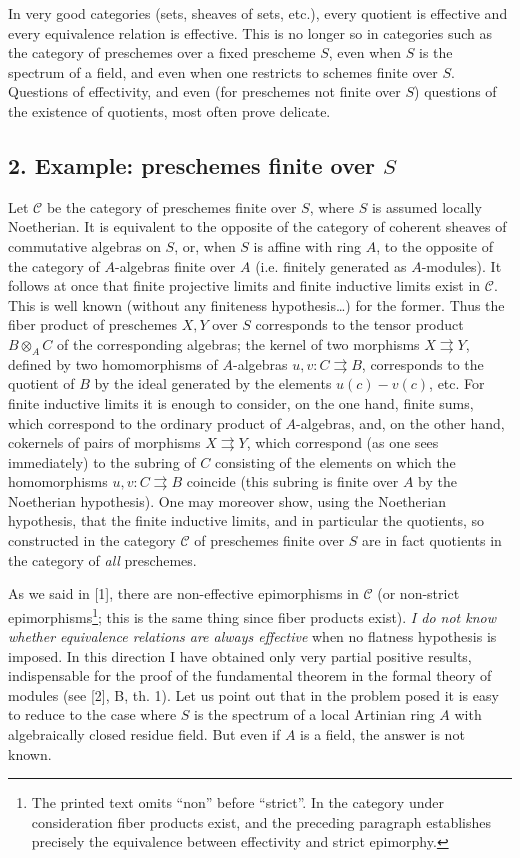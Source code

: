 In very good categories (sets, sheaves of sets, etc.), every quotient is
effective and every equivalence relation is effective. This is no longer so
in categories such as the category of preschemes over a fixed prescheme $S$,
even when $S$ is the spectrum of a field, and even when one restricts to
schemes finite over $S$. Questions of effectivity, and even (for preschemes
not finite over $S$) questions of the existence of quotients, most often prove
delicate.

\subsection*{2. Example: preschemes finite over $S$}

Let $\mathcal C$ be the category of preschemes finite over $S$, where $S$ is
assumed locally Noetherian. It is equivalent to the opposite of the category
of coherent sheaves of commutative algebras on $S$, or, when $S$ is affine
with ring $A$, to the opposite of the category of $A$-algebras finite over
$A$ (i.e. finitely generated as $A$-modules). It follows at once that finite
projective limits and finite inductive limits exist in $\mathcal C$. This is
well known (without any finiteness hypothesis\ldots) for the former. Thus the
fiber product of preschemes $X,Y$ over $S$ corresponds to the tensor product
$B\otimes_A C$ of the corresponding algebras; the kernel of two morphisms
$X\rightrightarrows Y$, defined by two homomorphisms of $A$-algebras
$u,v:C\rightrightarrows B$, corresponds to the quotient of $B$ by the ideal
generated by the elements $u(c)-v(c)$, etc. For finite inductive limits it is
enough to consider, on the one hand, finite sums, which correspond to the
ordinary product of $A$-algebras, and, on the other hand, cokernels of pairs of
morphisms $X\rightrightarrows Y$, which correspond (as one sees immediately)
to the subring of $C$ consisting of the elements on which the homomorphisms
$u,v:C\rightrightarrows B$ coincide (this subring is finite over $A$ by the
Noetherian hypothesis). One may moreover show, using the Noetherian
hypothesis, that the finite inductive limits, and in particular the quotients,
so constructed in the category $\mathcal C$ of preschemes finite over $S$ are
in fact quotients in the category of \emph{all} preschemes.

As we said in [1], there are non-effective epimorphisms in $\mathcal C$ (or
non-strict epimorphisms\footnote{The printed text omits ``non'' before
``strict''. In the category under consideration fiber products exist, and the
preceding paragraph establishes precisely the equivalence between effectivity
and strict epimorphy.}; this is the same thing since fiber products exist).
\emph{I do not know whether equivalence relations are always effective} when
no flatness hypothesis is imposed. In this direction I have obtained only very
partial positive results, indispensable for the proof of the fundamental
theorem in the formal theory of modules (see [2], B, th. 1). Let us point out
that in the problem posed it is easy to reduce to the case where $S$ is the
spectrum of a local Artinian ring $A$ with algebraically closed residue field.
But even if $A$ is a field, the answer is not known.

